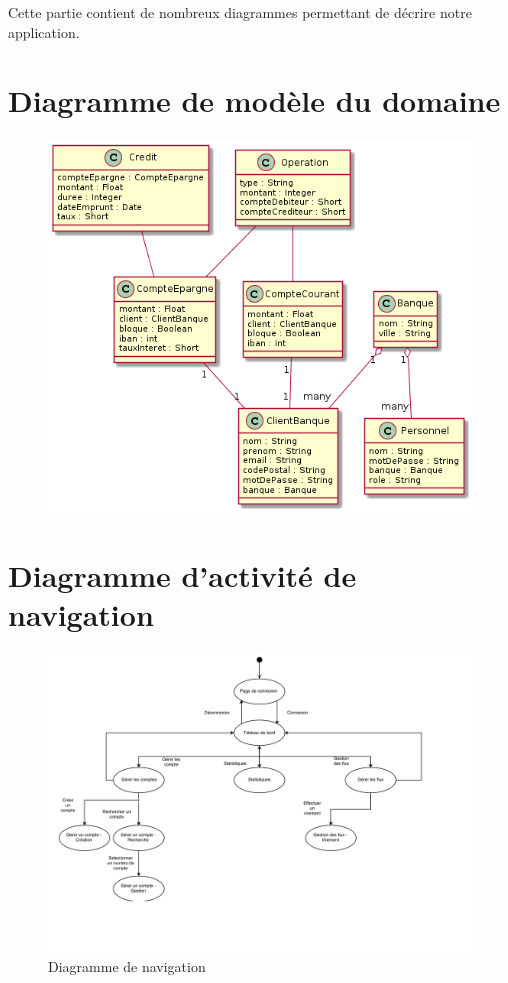 Cette partie contient de nombreux diagrammes permettant de décrire notre application.
\section{Diagramme de modèle du domaine}
\begin{figure}[h!]
\begin{center}
   \caption{\color{orange}{Diagramme de modèle du domaine}}
   \includegraphics[scale=0.5]{images/modeleDuDomaine.png}
   \end{center}
\end{figure}
\newpage
\section{Diagramme d'activité de navigation}
\begin{figure}[h!]
\begin{center}
   \caption{Diagramme de navigation}
   \includegraphics[scale=0.2]{images/navigation.png}
   \end{center}
\end{figure}
\newpage
